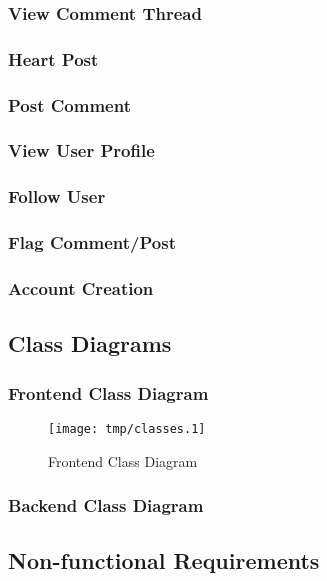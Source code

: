         \subsubsection{View Comment Thread}
        \subsubsection{Heart Post}
        \subsubsection{Post Comment}
        \subsubsection{View User Profile}
        \subsubsection{Follow User}
        \subsubsection{Flag Comment/Post}
        \subsubsection{Account Creation}


    \subsection{Class Diagrams}
        \subsubsection{Frontend Class Diagram}
            \begin{figure}[H]
                \centering
                \texttt{[image: tmp/classes.1]} 
                \caption{Frontend Class Diagram}
            \end{figure}

        \subsubsection{Backend Class Diagram}

    \subsection{Non-functional Requirements}

